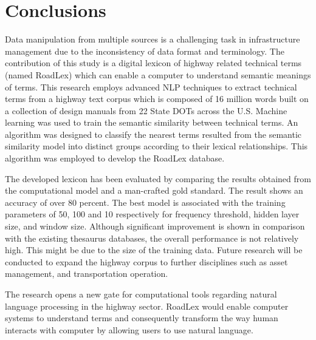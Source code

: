 \documentclass[Journal,InsideFigs, DoubleSpace]{ascelike} %
\begin{document}
\section{Conclusions} \label{sec:conclns3} 
Data manipulation from multiple sources is a challenging task in infrastructure management due to the inconsistency of data format and terminology. The contribution of this study is a digital lexicon of highway related technical terms (named RoadLex) which can enable a computer to understand semantic meanings of terms.  This research employs advanced NLP techniques to extract technical terms from a highway text corpus which is composed of 16 million words built on a collection of design manuals from 22 State DOTs across the U.S. Machine learning was used to train the semantic similarity between technical terms. An algorithm was designed to classify the nearest terms resulted from the semantic similarity model into distinct groups according to their lexical relationships. This algorithm was employed to develop the RoadLex database. 
\par
The developed lexicon has been evaluated by comparing the results obtained from the computational model and a man-crafted gold standard. The result shows an accuracy of over 80 percent.  The best model is associated with the training parameters of 50, 100 and 10 respectively for frequency threshold, hidden layer size, and window size. Although significant improvement is shown in comparison with the existing thesaurus databases, the overall performance is not relatively high. This might be due to the size of the training data. Future research will be conducted to expand the highway corpus to further disciplines such as asset management, and transportation operation. 
\par
The research opens a new gate for computational tools regarding natural language processing in the highway sector. RoadLex would enable computer systems to understand terms and consequently transform the way human interacts with computer by allowing users to use natural language. 


%
%
\end{document}
